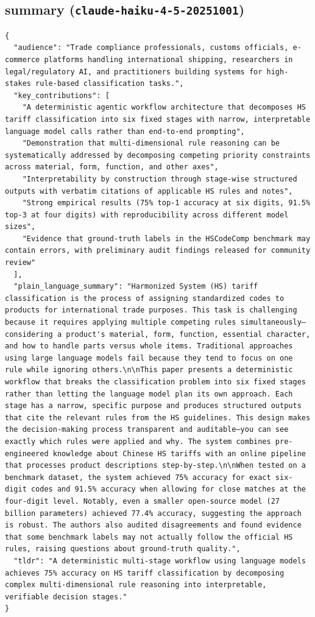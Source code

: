 \documentclass[11pt]{article}
\begin{document}
\subsection*{summary (\texttt{claude-haiku-4-5-20251001})}
\begin{verbatim}
{
  "audience": "Trade compliance professionals, customs officials, e-commerce platforms handling international shipping, researchers in legal/regulatory AI, and practitioners building systems for high-stakes rule-based classification tasks.",
  "key_contributions": [
    "A deterministic agentic workflow architecture that decomposes HS tariff classification into six fixed stages with narrow, interpretable language model calls rather than end-to-end prompting",
    "Demonstration that multi-dimensional rule reasoning can be systematically addressed by decomposing competing priority constraints across material, form, function, and other axes",
    "Interpretability by construction through stage-wise structured outputs with verbatim citations of applicable HS rules and notes",
    "Strong empirical results (75% top-1 accuracy at six digits, 91.5% top-3 at four digits) with reproducibility across different model sizes",
    "Evidence that ground-truth labels in the HSCodeComp benchmark may contain errors, with preliminary audit findings released for community review"
  ],
  "plain_language_summary": "Harmonized System (HS) tariff classification is the process of assigning standardized codes to products for international trade purposes. This task is challenging because it requires applying multiple competing rules simultaneously—considering a product's material, form, function, essential character, and how to handle parts versus whole items. Traditional approaches using large language models fail because they tend to focus on one rule while ignoring others.\n\nThis paper presents a deterministic workflow that breaks the classification problem into six fixed stages rather than letting the language model plan its own approach. Each stage has a narrow, specific purpose and produces structured outputs that cite the relevant rules from the HS guidelines. This design makes the decision-making process transparent and auditable—you can see exactly which rules were applied and why. The system combines pre-engineered knowledge about Chinese HS tariffs with an online pipeline that processes product descriptions step-by-step.\n\nWhen tested on a benchmark dataset, the system achieved 75% accuracy for exact six-digit codes and 91.5% accuracy when allowing for close matches at the four-digit level. Notably, even a smaller open-source model (27 billion parameters) achieved 77.4% accuracy, suggesting the approach is robust. The authors also audited disagreements and found evidence that some benchmark labels may not actually follow the official HS rules, raising questions about ground-truth quality.",
  "tldr": "A deterministic multi-stage workflow using language models achieves 75% accuracy on HS tariff classification by decomposing complex multi-dimensional rule reasoning into interpretable, verifiable decision stages."
}
\end{verbatim}
\end{document}
